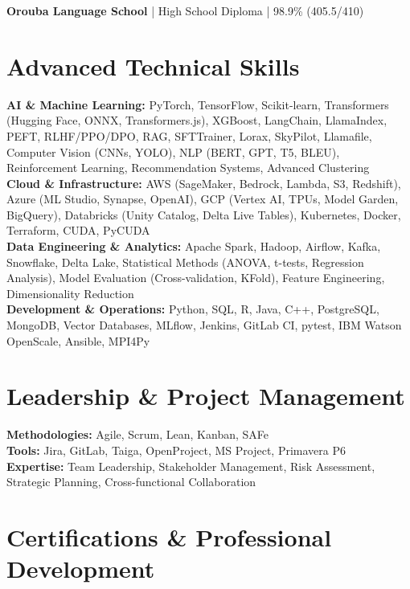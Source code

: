 \documentclass[10pt, letterpaper]{article}
\begin{document}
\textbf{Orouba Language School} | High School Diploma | 98.9\% (405.5/410)

\section{Advanced Technical Skills}

\textbf{\textcolor{primaryColor}{AI \& Machine Learning:}}
PyTorch, TensorFlow, Scikit-learn, Transformers (Hugging Face, ONNX, Transformers.js), XGBoost, LangChain, LlamaIndex, PEFT, RLHF/PPO/DPO, RAG, SFTTrainer, Lorax, SkyPilot, Llamafile, Computer Vision (CNNs, YOLO), NLP (BERT, GPT, T5, BLEU), Reinforcement Learning, Recommendation Systems, Advanced Clustering \\

\textbf{\textcolor{primaryColor}{Cloud \& Infrastructure:}}
AWS (SageMaker, Bedrock, Lambda, S3, Redshift), Azure (ML Studio, Synapse, OpenAI), GCP (Vertex AI, TPUs, Model Garden, BigQuery), Databricks (Unity Catalog, Delta Live Tables), Kubernetes, Docker, Terraform, CUDA, PyCUDA \\

\textbf{\textcolor{primaryColor}{Data Engineering \& Analytics:}}
Apache Spark, Hadoop, Airflow, Kafka, Snowflake, Delta Lake, Statistical Methods (ANOVA, t-tests, Regression Analysis), Model Evaluation (Cross-validation, KFold), Feature Engineering, Dimensionality Reduction \\

\textbf{\textcolor{primaryColor}{Development \& Operations:}}
Python, SQL, R, Java, C++, PostgreSQL, MongoDB, Vector Databases, MLflow, Jenkins, GitLab CI, pytest, IBM Watson OpenScale, Ansible, MPI4Py

\section{Leadership \& Project Management}
\textbf{\textcolor{primaryColor}{Methodologies:}} Agile, Scrum, Lean, Kanban, SAFe \\
\textbf{\textcolor{primaryColor}{Tools:}} Jira, GitLab, Taiga, OpenProject, MS Project, Primavera P6 \\
\textbf{\textcolor{primaryColor}{Expertise:}} Team Leadership, Stakeholder Management, Risk Assessment, Strategic Planning, Cross-functional Collaboration

\section{Certifications \& Professional Development}
\end{document}
